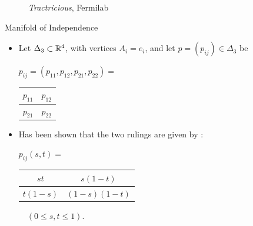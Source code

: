 \begin{frame}
\begin{figure}[!htb]
\begin{minipage}{.3\textwidth}
        \caption{\emph{Tractricious}, Fermilab}
    \end{minipage}
    \end{figure}

\end{frame}

\begin{frame}{Manifold of Independence}

    \begin{itemize}
        \item Let $\Delta_{3} \subset \mathbb{R}^{4}$, with vertices $A_{i} = e_{i}$, and let $p = (p_{ij}) \in \Delta_{3}$ be
        \vspace{-6pt}
        \begin{center}
        \begin{table}[]
        $p_{ij} = (p_{11}, p_{12}, p_{21}, p_{22}) =$ 
        \begin{tabular}{|l|l|}
        \hline
        $p_{11}$ & $p_{12}$ \\ \hline
        $p_{21}$ & $p_{22}$ \\ \hline
        \end{tabular}
        \end{table}
        \end{center}

    \item Has been shown that the two rulings are given by \cite{SFJG1970}:
    
    \begin{center}
    \begin{table}[]
    $p_{ij}(s,t) =$
    \begin{tabular}{|c|c|}
    \hline
    $st$ & $s(1-t)$ \\ \hline
    $t(1-s)$ & $(1-s)(1-t)$ \\ \hline
    \end{tabular}
    $\quad (0 \leq s,t \leq 1).$
    \end{table}
    \end{center}
    
    \end{itemize}


\end{frame}
